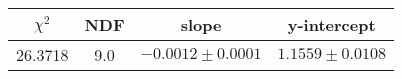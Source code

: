 \begin{tabular}{|c|c|c|c|}

\hline
$\chi^{2}$ & NDF & slope & y-intercept  \\
\hline
26.3718 & 9.0 & $-0.0012\pm0.0001$ & $1.1559\pm0.0108$ \\
\hline

\end{tabular}